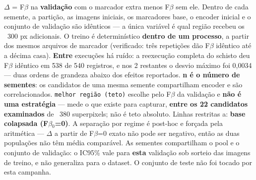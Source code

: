 \footnotesize $\Delta$ = F$\beta$ na \textbf{validação} com o marcador extra menos F$\beta$ sem ele. Dentro de cada semente, a partição, as imagens iniciais, os marcadores base, o encoder inicial e o conjunto de validação são idênticos --- a única variável é qual região recebeu os ~300 px adicionais. O treino é determinístico \textbf{dentro de um processo}, a partir dos mesmos arquivos de marcador (verificado: três repetições dão F$\beta$ idêntico até a décima casa). \textbf{Entre} execuções há ruído: a reexecução completa do schisto deu F$\beta$ idêntico em 538 de 540 registros, e nos 2 restantes o desvio máximo foi 0,0034 --- duas ordens de grandeza abaixo dos efeitos reportados. \textbf{n é o número de sementes}: os candidatos de uma mesma semente compartilham encoder e são correlacionados. \texttt{melhor região (teto)} escolhe pelo F$\beta$ da validação e \textbf{não é uma estratégia} --- mede o que existe para capturar, \textbf{entre os 22 candidatos examinados} de ~380 superpixels; não é teto absoluto. Linhas restritas a: \textbf{base colapsada (F$\beta$$_0$=0)}. A separação por regime é post-hoc e forçada pela aritmética --- $\Delta$ a partir de F$\beta$=0 exato não pode ser negativo, então as duas populações não têm média comparável. As sementes compartilham o pool e o conjunto de validação: o IC95\% vale para \textbf{esta} validação sob sorteio das imagens de treino, e não generaliza para o dataset. O conjunto de teste não foi tocado por esta campanha.
\normalsize

